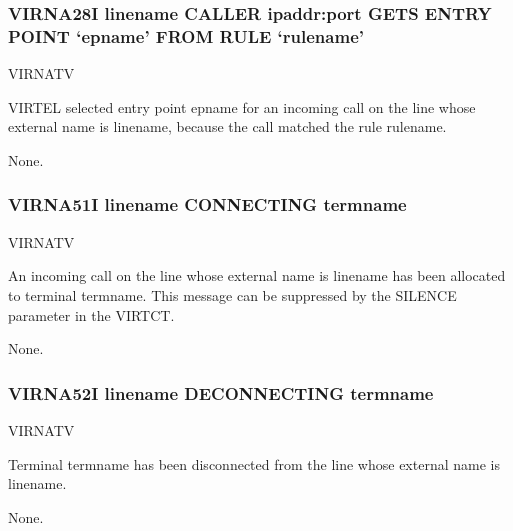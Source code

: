 \documentclass[letterpaper,10pt,english]{sphinxmanual}
\begin{document}
\subsubsection{VIRNA28I linename CALLER ipaddr:port GETS ENTRY POINT ‘epname’ FROM RULE ‘rulename’}
\label{\detokenize{messages:virna28i-linename-caller-ipaddr-port-gets-entry-point-epname-from-rule-rulename}}\begin{description}
\sphinxAtStartPar
VIRNATV

\sphinxAtStartPar
VIRTEL selected entry point epname for an incoming call on the line whose external name is linename, because the call matched the rule rulename.

\sphinxAtStartPar
None.

\end{description}


\subsubsection{VIRNA51I linename CONNECTING termname}
\label{\detokenize{messages:virna51i-linename-connecting-termname}}\begin{description}
\sphinxAtStartPar
VIRNATV

\sphinxAtStartPar
An incoming call on the line whose external name is linename has been allocated to terminal termname. This message can be suppressed by the SILENCE parameter in the VIRTCT.

\sphinxAtStartPar
None.

\end{description}


\subsubsection{VIRNA52I linename DECONNECTING termname}
\label{\detokenize{messages:virna52i-linename-deconnecting-termname}}\begin{description}
\sphinxAtStartPar
VIRNATV

\sphinxAtStartPar
Terminal termname has been disconnected from the line whose external name is linename.

\sphinxAtStartPar
None.

\end{description}
\end{document}
